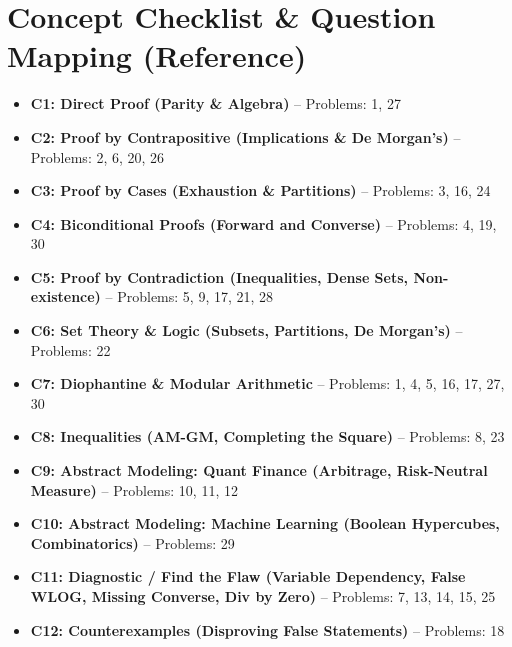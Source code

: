 \documentclass[11pt]{article}
\begin{document}
\newpage

\section{Concept Checklist \& Question Mapping (Reference)}
\label{sec:checklist_end}

\begin{itemize}
    \item \textbf{C1: Direct Proof (Parity \& Algebra)} -- Problems: 1, 27
    \item \textbf{C2: Proof by Contrapositive (Implications \& De Morgan's)} -- Problems: 2, 6, 20, 26
    \item \textbf{C3: Proof by Cases (Exhaustion \& Partitions)} -- Problems: 3, 16, 24
    \item \textbf{C4: Biconditional Proofs (Forward and Converse)} -- Problems: 4, 19, 30
    \item \textbf{C5: Proof by Contradiction (Inequalities, Dense Sets, Non-existence)} -- Problems: 5, 9, 17, 21, 28
    \item \textbf{C6: Set Theory \& Logic (Subsets, Partitions, De Morgan's)} -- Problems: 22
    \item \textbf{C7: Diophantine \& Modular Arithmetic} -- Problems: 1, 4, 5, 16, 17, 27, 30
    \item \textbf{C8: Inequalities (AM-GM, Completing the Square)} -- Problems: 8, 23
    \item \textbf{C9: Abstract Modeling: Quant Finance (Arbitrage, Risk-Neutral Measure)} -- Problems: 10, 11, 12
    \item \textbf{C10: Abstract Modeling: Machine Learning (Boolean Hypercubes, Combinatorics)} -- Problems: 29
    \item \textbf{C11: Diagnostic / Find the Flaw (Variable Dependency, False WLOG, Missing Converse, Div by Zero)} -- Problems: 7, 13, 14, 15, 25
    \item \textbf{C12: Counterexamples (Disproving False Statements)} -- Problems: 18
\end{itemize}
\end{document}
